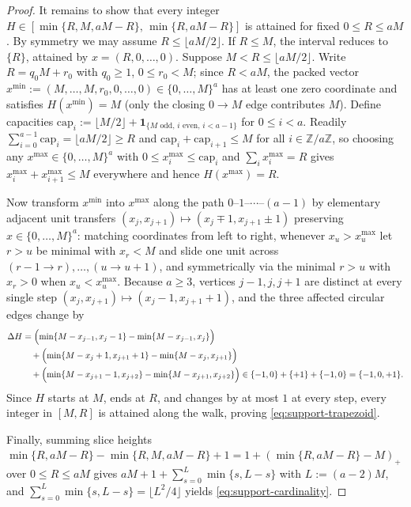 \documentclass[preprint,12pt]{elsarticle}
\newcommand{\Z}{\mathbb Z}
\numberwithin{equation}{section}
\theoremstyle{plain}
\theoremstyle{definition}
\theoremstyle{remark}
\begin{document}
\begin{proof}
It remains to show that every integer $H\in[\min\{R,M,aM-R\},\,\min\{R,aM-R\}]$ is
attained for fixed $0\le R\le aM$. By symmetry we may assume $R\le\lfloor aM/2\rfloor$.
If $R\le M$, the interval reduces to $\{R\}$, attained by $x=(R,0,\dots,0)$. Suppose
$M<R\le\lfloor aM/2\rfloor$. Write $R=q_0 M+r_0$ with $q_0\ge 1$, $0\le r_0<M$;
since $R<aM$, the packed vector $x^{\min}:=(M,\dots,M,r_0,0,\dots,0)\in\{0,\dots,M\}^a$
has at least one zero coordinate and satisfies $H(x^{\min})=M$ (only the closing
$0\to M$ edge contributes $M$). Define capacities
$\mathrm{cap}_i:=\lfloor M/2\rfloor+\mathbf 1_{\{M\text{ odd},\,i\text{ even},\,i<a-1\}}$
for $0\le i<a$. Readily $\sum_{i=0}^{a-1}\mathrm{cap}_i=\lfloor aM/2\rfloor\ge R$
and $\mathrm{cap}_i+\mathrm{cap}_{i+1}\le M$ for all $i\in\Z/a\Z$, so choosing any
$x^{\max}\in\{0,\dots,M\}^a$ with $0\le x^{\max}_i\le\mathrm{cap}_i$ and
$\sum_i x^{\max}_i=R$ gives $x^{\max}_i+x^{\max}_{i+1}\le M$ everywhere and hence
$H(x^{\max})=R$.

Now transform $x^{\min}$ into $x^{\max}$ along the path $0\text{--}1\text{--}\cdots\text{--}(a-1)$
by elementary adjacent unit transfers $(x_j,x_{j+1})\mapsto(x_j\mp 1,x_{j+1}\pm 1)$
preserving $x\in\{0,\dots,M\}^a$: matching coordinates from left to right, whenever $x_u>x^{\max}_u$ let $r>u$ be
minimal with $x_r<M$ and slide one unit across $(r-1\to r),\dots,(u\to u+1)$,
and symmetrically via the minimal $r>u$ with $x_r>0$ when $x_u<x^{\max}_u$. Because $a\ge 3$, vertices $j-1,j,j+1$ are
distinct at every single step $(x_j,x_{j+1})\mapsto(x_j-1,x_{j+1}+1)$, and the
three affected circular edges change by
\begin{align*}
\Delta H
 &=\Bigl(\min\{M-x_{j-1},x_j-1\}-\min\{M-x_{j-1},x_j\}\Bigr) \\
 &\quad +\Bigl(\min\{M-x_j+1,x_{j+1}+1\}-\min\{M-x_j,x_{j+1}\}\Bigr) \\
 &\quad +\Bigl(\min\{M-x_{j+1}-1,x_{j+2}\}-\min\{M-x_{j+1},x_{j+2}\}\Bigr)
 \in\{-1,0\}+\{+1\}+\{-1,0\}=\{-1,0,+1\}.
\end{align*}
Since $H$ starts at $M$, ends at $R$, and changes by at most $1$ at every step,
every integer in $[M,R]$ is attained along the walk, proving \eqref{eq:support-trapezoid}.

Finally, summing slice heights $\min\{R,aM-R\}-\min\{R,M,aM-R\}+1
=1+(\min\{R,aM-R\}-M)_+$ over $0\le R\le aM$ gives $aM+1+\sum_{s=0}^{L}\min\{s,L-s\}$
with $L:=(a-2)M$, and $\sum_{s=0}^{L}\min\{s,L-s\}=\lfloor L^2/4\rfloor$ yields
\eqref{eq:support-cardinality}.
\end{proof}
\end{document}
